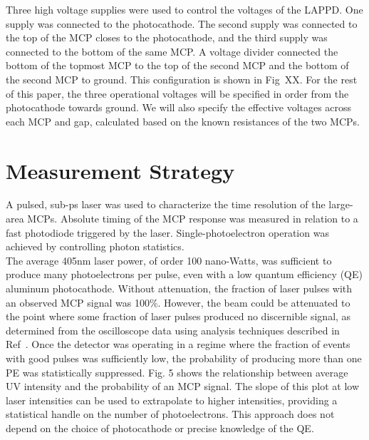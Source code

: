 \documentclass[preprint,12pt]{elsarticle}
\begin{document}
\noindent Three high voltage supplies were used to control the voltages of the LAPPD. One supply was connected to the photocathode. The second supply was connected to the top of the MCP closes to the photocathode, and the third supply was connected to the bottom of the same MCP. A voltage divider connected the bottom of the topmost MCP to the top of the second MCP and the bottom of the second MCP to ground. This configuration is shown in Fig~XX. For the rest of this paper, the three operational voltages will be specified in order from the photocathode towards ground. We will also specify the effective voltages across each MCP and gap, calculated based on the known resistances of the two MCPs.\\





\section{Measurement Strategy}
\label{sec:Method}

\noindent A pulsed, sub-ps laser was used to characterize the time resolution of the large-area MCPs. Absolute timing of the MCP response was measured in relation to a fast photodiode triggered by the laser. Single-photoelectron operation was achieved by controlling photon statistics.\\

\noindent The average 405nm laser power, of order 100 nano-Watts, was sufficient to produce many photoelectrons per pulse, even with a low quantum efficiency (QE) aluminum photocathode. Without attenuation, the fraction of laser pulses with an observed MCP signal was 100\%. However, the beam could be attenuated to the point where some fraction of laser pulses produced no discernible signal, as determined from the oscilloscope data using analysis techniques described in Ref~\cite{RSI}. Once the detector was operating in a regime where the fraction of events with good pulses was sufficiently low, the probability of producing more than one PE was statistically suppressed. Fig. 5 shows the relationship between average UV intensity and the probability of an MCP signal. The slope of this plot at low laser intensities can be used to extrapolate to higher intensities, providing a statistical handle on the number of photoelectrons. This approach does not depend on the choice of photocathode or precise knowledge of the QE.\\
\end{document}
